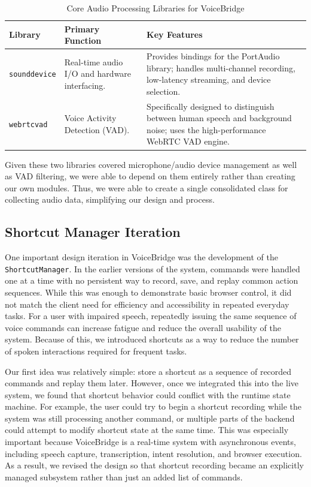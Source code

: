 \documentclass{article}
\begin{document}
\begin{table}[h]
\centering
\renewcommand{\arraystretch}{1.5}
\begin{tabular}{lp{5cm}p{6cm}}
\hline
\textbf{Library} & \textbf{Primary Function} & \textbf{Key Features} \\ \hline
\texttt{sounddevice} & Real-time audio I/O and hardware interfacing. & Provides bindings for the PortAudio library; handles multi-channel recording, low-latency streaming, and device selection. \\
\texttt{webrtcvad} & Voice Activity Detection (VAD). & Specifically designed to distinguish between human speech and background noise; uses the high-performance WebRTC VAD engine. \\ \hline
\end{tabular}
\caption{Core Audio Processing Libraries for VoiceBridge}
\label{tab:audio_libraries}
\end{table}

Given these two libraries covered microphone/audio device management as well as VAD filtering, we were able to depend on them entirely rather than creating our own modules. Thus, we were able to create a single consolidated class for collecting audio data, simplifying our design and process.

\subsection{Shortcut Manager Iteration}

One important design iteration in VoiceBridge was the development of the
\texttt{ShortcutManager}. In the earlier versions of the system, commands were
handled one at a time with no persistent way to record, save, and replay common
action sequences. While this was enough to demonstrate basic browser control, it
did not match the client need for efficiency and accessibility in repeated
everyday tasks. For a user with impaired speech, repeatedly issuing the same
sequence of voice commands can increase fatigue and reduce the overall usability
of the system. Because of this, we introduced shortcuts as a way to reduce the
number of spoken interactions required for frequent tasks.

Our first idea was relatively simple: store a shortcut as a sequence of recorded
commands and replay them later. However, once we integrated this into the live
system, we found that shortcut behavior could conflict with the runtime state
machine. For example, the user could try to begin a shortcut recording while the
system was still processing another command, or multiple parts of the backend
could attempt to modify shortcut state at the same time. This was especially
important because VoiceBridge is a real-time system with asynchronous events,
including speech capture, transcription, intent resolution, and browser
execution. As a result, we revised the design so that shortcut recording became
an explicitly managed subsystem rather than just an added list of commands.
\end{document}
